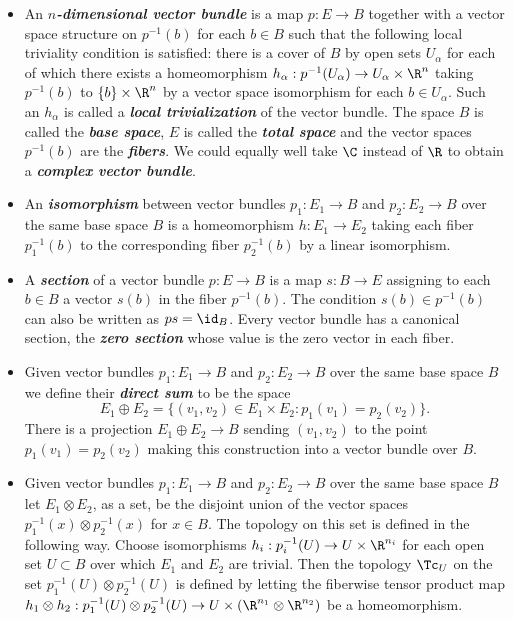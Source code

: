 \begin{defn}\leavevmode
	\begin{itemize}
		\item An \textbf{\textit{$n$-dimensional vector bundle}} is a map $p:E\to B$ together with a vector space structure on $p^{-1}(b)$ for each $b\in B$ such that the following local triviality condition is satisfied: there is a cover of $B$ by open sets $U_\alpha$ for each of which there exists a homeomorphism $h_\alpha:p^{-1}(U_\alpha)\to U_\alpha\times\R^n$ taking $p^{-1}(b)$ to $\{b\}\times\R^n$ by a vector space isomorphism for each $b\in U_\alpha$. Such an $h_\alpha$ is called a \textbf{\textit{local trivialization}} of the vector bundle. The space $B$ is called the \textbf{\textit{base space}}, $E$ is called the \textbf{\textit{total space}} and the vector spaces $p^{-1}(b)$ are the \textbf{\textit{fibers}}. We could equally well take $\C$ instead of $\R$ to obtain a \textbf{\textit{complex vector bundle}}.
		
		\item An \textbf{\textit{isomorphism}} between vector bundles $p_1:E_1\to B$ and $p_2:E_2\to B$ over the same base space $B$ is a homeomorphism $h:E_1\to E_2$ taking each fiber $p_1^{-1}(b)$ to the corresponding fiber $p_2^{-1}(b)$ by a linear isomorphism.
		
		\item A \textbf{\textit{section}} of a vector bundle $p:E\to B$ is a map $s:B\to E$ assigning to each $b\in B$ a vector $s(b)$ in the fiber $p^{-1}(b)$. The condition $s(b)\in p^{-1}(b)$ can also be written as $ps=\id_B$. Every vector bundle has a canonical section, the \textbf{\textit{zero section}} whose value is the zero vector in each fiber.
		
		\item Given vector bundles $p_1:E_1\to B$ and $p_2:E_2\to B$ over the same base space $B$ we define their \textbf{\textit{direct sum}} to be the space
		\[E_1\oplus E_2=\{(v_1,v_2)\in E_1\times E_2:p_1(v_1)=p_2(v_2)\}.\]
		There is a projection $E_1\oplus E_2\to B$ sending $(v_1,v_2)$ to the point $p_1(v_1)=p_2(v_2)$ making this construction into a vector bundle over $B$.
		
		\item Given vector bundles $p_1:E_1\to B$ and $p_2:E_2\to B$ over the same base space $B$ let $E_1\otimes E_2$, as a set, be the disjoint union of the vector spaces $p_1^{-1}(x)\otimes p_2^{-1}(x)$ for $x\in B$. The topology on this set is defined in the following way. Choose isomorphisms $h_i:p_i^{-1}(U)\to U\times\R^{n_i}$ for each open set $U\subset B$ over which $E_1$ and $E_2$ are trivial. Then the topology $\Tc_U$ on the set $p_1^{-1}(U)\otimes p_2^{-1}(U)$ is defined by letting the fiberwise tensor product map $h_1\otimes h_2:p_1^{-1}(U)\otimes p_2^{-1}(U)\to U\times (\R^{n_1}\otimes\R^{n_2})$ be a homeomorphism.
		

\end{itemize}
\end{defn}
